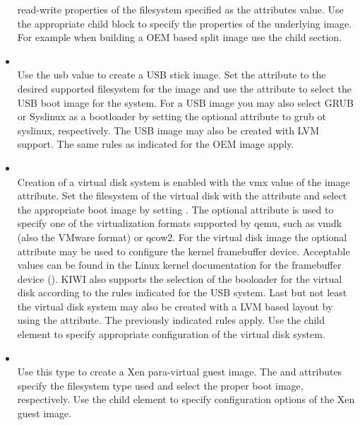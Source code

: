 \begin{itemize}
      read-write properties of the filesystem specified as the attributes
      value. Use the appropriate  child block to specify
      the properties of the underlying image. For example when building a 
      OEM based split image use the  child section.
\item {}\\
      Use the usb value to create a USB stick image. Set the
       attribute to the desired supported filesystem for
      the image and use the  attribute to
      select the USB boot image for the system. For a USB image you may
      also select GRUB or Syslinux as a bootloader by setting the
      optional  attribute to grub ot syslinux,
      respectively. The USB image may also be created with LVM support.
      The same rules as indicated for the OEM image apply.
\item {}\\
      Creation of a virtual disk system is enabled with the vmx value of
      the image attribute. Set the filesystem of the virtual disk with
      the  attribute and select the appropriate boot
      image by setting . The optional
       attribute is used to specify one of the virtualization
      formats supported by qemu, such as vmdk (also the VMware format) or
      qcow2. For the virtual disk image the optional  attribute
      may be used to configure the kernel framebuffer device. Acceptable
      values can be found in the Linux kernel documentation for the
      framebuffer device (). KIWI also supports
      the selection of the booloader for the virtual disk according to
      the rules indicated for the USB system. Last but not least
      the virtual disk system may also be created with a LVM based layout by
      using the  attribute. The previously indicated rules apply.
      Use the  child element
      to specify appropriate configuration of the virtual disk system.
\item {}\\
      Use this type to create a Xen para-virtual guest image. The
       and  attributes
      specify the filesystem type used and select the proper boot image,
      respectively. Use the  child element to specify
      configuration options of the Xen guest image.
\end{itemize}

